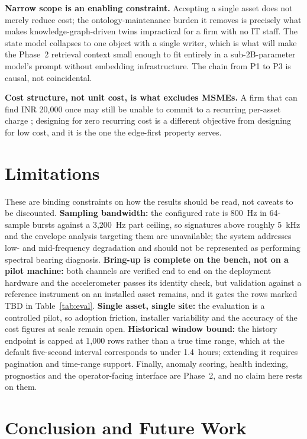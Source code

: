 \documentclass[conference]{IEEEtran}
\begin{document}
\textbf{Narrow scope is an enabling constraint.} Accepting a single asset
does not merely reduce cost; the ontology-maintenance burden it removes is
precisely what makes knowledge-graph-driven twins impractical for a firm
with no IT staff. The state model collapses to one object with a single
writer, which is what will make the Phase~2 retrieval context small enough
to fit entirely in a sub-2B-parameter model's prompt without embedding
infrastructure. The chain from P1 to P3 is causal, not coincidental.

\textbf{Cost structure, not unit cost, is what excludes MSMEs.} A firm that
can find INR 20,000 once may still be unable to commit to a recurring
per-asset charge \cite{b33,b34}; designing for zero recurring cost is a
different objective from designing for low cost, and it is the one the
edge-first property serves.

\section{Limitations}
\label{sec:limits}

These are binding constraints on how the results should be read, not caveats
to be discounted. \textbf{Sampling bandwidth:} the configured rate is 800~Hz
in 64-sample bursts against a 3,200~Hz part ceiling, so signatures above
roughly 5~kHz and the envelope analysis targeting them \cite{b9} are
unavailable; the system addresses low- and mid-frequency degradation and
should not be represented as performing spectral bearing diagnosis.
\textbf{Bring-up is complete on the bench, not on a pilot machine:} both
channels are verified end to end on the deployment hardware and the
accelerometer passes its identity check, but validation against a reference
instrument on an installed asset remains, and it gates the rows marked TBD
in Table~\ref{tab:eval}.
\textbf{Single asset, single site:} the evaluation is a controlled pilot,
so adoption friction, installer variability and the accuracy of the cost
figures at scale remain open.
\textbf{Historical window bound:} the history endpoint is capped at 1,000
rows rather than a true time range, which at the default five-second
interval corresponds to under 1.4~hours; extending it requires pagination
and time-range support. Finally, anomaly scoring, health indexing,
prognostics and the operator-facing interface are Phase~2, and no claim here
rests on them.

\section{Conclusion and Future Work}
\label{sec:conc}
\end{document}
